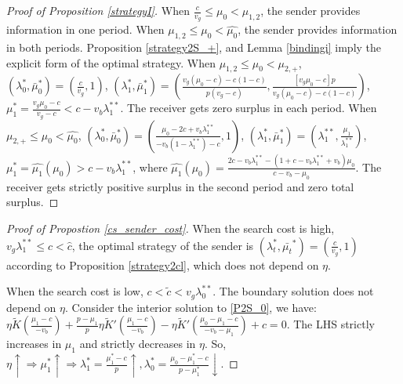 \documentclass[11pt]{extarticle}
\newcommand{\ra}{\Rightarrow}
\begin{document}
\begin{proof}[Proof of Proposition \ref{strategyI}]
	When $\frac{c}{v_g} \leq \mu_0 < \mu_{1,2}$, the sender provides information in one period. When $\mu_{1,2} \leq \mu_0 < \widehat{\mu_0}$, the sender provides information in both periods. Proposition \ref{strategy2S_+}, and Lemma \ref{bindingi} imply the explicit form of the optimal strategy. When $\mu_{1,2} \leq \mu_0 < \mu_{2,+}$, $(\lambda_0^*,\bar{\mu}_0^*) = (\frac{c}{v_g},1)$, $(\lambda_1^*,\bar{\mu}_1^*) = (\frac{v_g(\mu_0-c)-c(1-c)}{p(v_g-c)}, \frac{[v_g\mu_0-c]p}{v_g(\mu_0-c)-c(1-c)})$, $\mu_1^* = \frac{v_g\mu_0-c}{v_g-c} < c-v_b\lambda_1^{**}$. The receiver gets zero surplus in each period. When $\mu_{2,+} \leq \mu_0 < \widehat{\mu_0}$, $(\lambda_0^*,\bar{\mu}_0^*) = (\frac{\mu_0-2c +v_b \lambda_1^{**}}{-v_b(1-\lambda_1^{**})-c},1)$, $(\lambda_1^*,\bar{\mu}_1^*)=(\lambda_1^{**},\frac{\mu_1}{\lambda_1^{**}})$, $\mu_1^* = \widehat{\mu_1}(\mu_0) > c-v_b\lambda_1^{**}$, where $\widehat{\mu_1}(\mu_0) = \frac{2c-v_b\lambda_1^{**}-(1+c-v_b\lambda_1^{**}+v_b)\mu_0}{c-v_b-\mu_0}$. The receiver gets strictly positive surplus in the second period and zero total surplus. 
\end{proof}


\begin{proof}[Proof of Propostion \ref{cs_sender_cost}]
	When the search cost is high, $v_g\lambda_1^{**} \leq c < \widehat{c}$, the optimal strategy of the sender is  $(\lambda_t^*,\bar{\mu_t}^*)=(\frac{c}{v_g},1)$ according to Proposition \ref{strategy2cl}, which does not depend on $\eta$.
	
	When the search cost is low, $c < \tilde{c} < v_g\lambda_0^{**}$. The boundary solution does not depend on $\eta$. Consider the interior solution to \eqref{P2S_0}, we have: $\eta \tilde{K}(\frac{\mu_1-c}{-v_b})+\frac{p-\mu_1}{p} \eta \tilde{K}'(\frac{\mu_1-c}{-v_b})-\eta \tilde{K}'(\frac{\mu_0-\mu_1-c}{-v_b-\mu_1})+c=0$. The LHS strictly increases in $\mu_1$ and strictly decreases in $\eta$. So, $\eta \uparrow \ra \mu_1^* \uparrow \ra \lambda_1^{*} = \frac{\mu_1^*-c}{p} \uparrow,  \lambda_0^* = \frac{\mu_0-\mu_1^*-c}{p-\mu_1^*} \downarrow$.
\end{proof}
\end{document}
